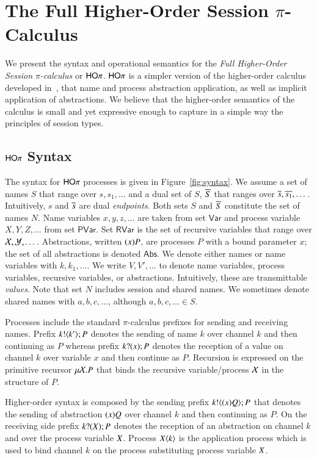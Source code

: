 \section{The Full Higher-Order Session $\pi$-Calculus}

We present the syntax and operational semantics for the
{\em Full Higher-Order Session $\pi$-calculus} or $\mathsf{HO}\pi$.
$\mathsf{HO}\pi$ is a simpler version of the higher-order calculus developed
in~\cite{tlca07}, that name and process abstraction application, as
well as implicit application of abstractions. We believe that
the higher-order semantics of the calculus is small and yet expressive
enough to capture in a simple way the principles of
session types.

\subsection{$\mathsf{HO}\pi$ Syntax}

The syntax for $\mathsf{HO}\pi$ processes is given in Figure~\ref{fig:syntax}.
We assume a set of names $S$ that range over $s, s_1, \dots$
and a dual set of $S$, $\overline{S}$ that ranges over $\overline{s}, \overline{s_1}, \dots$.
Intuitively, $s$ and $\overline{s}$ are dual \emph{endpoints}.
Both sets $S$ and $\overline{S}$ constitute the set of names $N$.
Name variables $x, y, z, \dots$ are taken from set $\mathsf{Var}$ and
process variable $X, Y, Z, \dots$ from set $\mathsf{PVar}$. 
Set $\mathsf{RVar}$ is the set of recursive 
variables that range over $\mathcal{X}, \mathcal{Y}, \dots$.
Abstractions, written $(x)P$, are processes $P$ with a bound parameter $x$;
the set of all abstractions is denoted $\mathsf{Abs}$.
We denote either names or name variables with $k, k_1, \dots$.
We write $V, V', \ldots$ to denote name variables, process variables, recursive variables, or abstractions.
Intuitively, these are transmittable \emph{values}.
Note that set $N$ includes session and shared names.
We sometimes denote shared names with $a,b, c, \dots$, although $a, b, c, \dots \in S$.

Processes include the standard $\pi$-calculus prefixes for sending and receiving names.
Prefix $k ! \langle k' \rangle ; P$ denotes the sending of name $k$ over channel $k$ and then
continuing as $P$ whereas prefix $k ? (x) ; P$ denotes the reception of a value
on channel $k$ over variable $x$ and then continue as $P$. Recursion is expressed
on the primitive recursor $\mu \mathcal{X}. P$ that binds the recursive variable/process
$\mathcal{X}$ in the structure of $P$.

Higher-order syntax is composed by the sending prefix $k ! \langle (x)Q \rangle ; P$ that
denotes the sending of abstraction $(x)Q$ over channel $k$ and then continuing
as $P$. On the receiving side prefix $k ? (X) ; P$ denotes the reception of an abstraction
on channel $k$ and over the process variable $X$. Process $X\langle k \rangle$ is the application
process which is used to bind channel $k$ on the process substituting process variable $X$.

